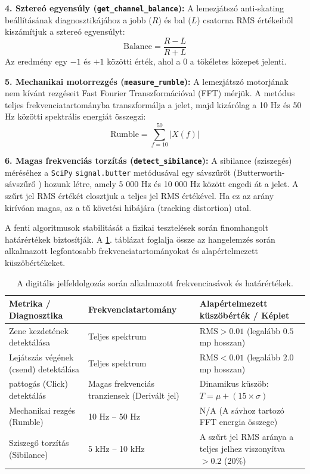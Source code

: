 \textbf{4. Sztereó egyensúly (\texttt{get\_channel\_balance}):}
A lemezjátszó anti-skating beállításának diagnosztikájához a jobb ($R$) és bal ($L$) csatorna RMS értékeiből kiszámítjuk a sztereó egyensúlyt:
\begin{equation}
\text{Balance} = \frac{R - L}{R + L}
\end{equation}
Az eredmény egy $-1$ és $+1$ közötti érték, ahol a $0$ a tökéletes közepet jelenti.

\textbf{5. Mechanikai motorrezgés (\texttt{measure\_rumble}):}
A lemezjátszó motorjának nem kívánt rezgéseit Fast Fourier Transzformációval (FFT) mérjük. A metódus teljes frekvenciatartományba transzformálja a jelet, majd kizárólag a 10 Hz és 50 Hz közötti spektrális energiát összegzi:
\begin{equation}
\text{Rumble} = \sum_{f=10}^{50} |X(f)|
\end{equation}

\textbf{6. Magas frekvenciás torzítás (\texttt{detect\_sibilance}):}
A sibilance (sziszegés) méréséhez a \texttt{SciPy} \texttt{signal.butter} metódusával egy sávszűrőt (Butterworth-sávszűrő \cite{butterworth}) hozunk létre, amely 5 000 Hz és 10 000 Hz között engedi át a jelet. A szűrt jel RMS értékét elosztjuk a teljes jel RMS értékével. Ha ez az arány kirívóan magas, az a tű követési hibájára (tracking distortion) utal.

A fenti algoritmusok stabilitását a fizikai tesztelések során finomhangolt határértékek biztosítják. A \ref{tab:dsp_params}. táblázat foglalja össze az hangelemzés során alkalmazott legfontosabb frekvenciatartományokat és alapértelmezett küszöbértékeket.

\begin{table}[H]
    \centering
    \renewcommand{\arraystretch}{1.3}
    \begin{tabular}{|p{4cm}|p{4.5cm}|p{5.5cm}|}
        \hline
        \textbf{Metrika / Diagnosztika} & \textbf{Frekvenciatartomány} & \textbf{Alapértelmezett küszöbérték / Képlet} \\ \hline
        Zene kezdetének detektálása & Teljes spektrum & $\mathrm{RMS} > 0.01$ (legalább $0.5$ mp hosszan) \\ \hline
        Lejátszás végének (csend) detektálása & Teljes spektrum & $\mathrm{RMS} < 0.01$ (legalább $2.0$ mp hosszan) \\ \hline
        pattogás (Click) detektálás & Magas frekvenciás tranziensek (Derivált jel) & Dinamikus küszöb: $T = \mu + (15 \times \sigma)$ \\ \hline
        Mechanikai rezgés (Rumble) & 10 Hz -- 50 Hz & N/A (A sávhoz tartozó FFT energia összege) \\ \hline
        Sziszegő torzítás (Sibilance) & 5 kHz -- 10 kHz & A szűrt jel RMS aránya a teljes jelhez viszonyítva $> 0.2$ (20\%) \\ \hline
    \end{tabular}
    \caption{A digitális jelfeldolgozás során alkalmazott frekvenciasávok és határértékek.}
    \label{tab:dsp_params}
\end{table}

